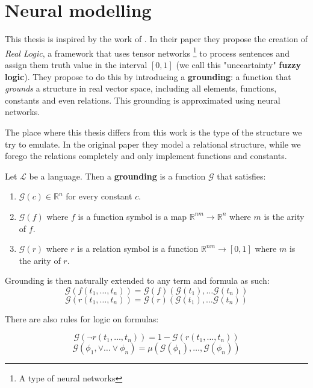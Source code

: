 \chapter{Neural modelling}

\label{chapter:implementation}
This thesis is inspired by the work of \cite{serafini}. In their paper they propose the creation of \textit{Real Logic}, a framework that uses tensor networks \footnote{A type of neural networks} to process sentences and assign them truth value in the interval $[0,1]$ (we call this "unceartainty" \textbf{fuzzy logic}). They propose to do this by introducing a \textbf{grounding}: a function that \textit{grounds} a structure in real vector space, including all elements, functions, constants and even relations. This grounding is approximated using neural networks. 

The place where this thesis differs from this work is the type of the structure we try to emulate. In the original paper they model a relational structure, while we forego the relations completely and only implement functions and constants.

\begin{defn}
	Let $\mathcal{L}$ be a language. Then a \textbf{grounding} is a function $\mathcal{G}$ that satisfies:
	\begin{enumerate}
		\item $\mathcal{G}(c)\in \mathbb{R}^n$ for every constant $c$.
		\item $\mathcal{G}(f)$ where $f$ is a function symbol is a map $\mathbb{R}^{nm}\rightarrow \mathbb{R}^n$ where $m$ is the arity of $f$.
		\item $\mathcal{G}(r)$ where $r$ is a relation symbol is a function $\mathbb{R}^{nm}\rightarrow [0,1]$ where $m$ is the arity of $r$.
	\end{enumerate}
\end{defn}

Grounding is then naturally extended to any term and formula as such:
$$\mathcal{G}(f(t_1,\dots,t_n))=\mathcal{G}(f)(\mathcal{G}(t_1),\dots\mathcal{G}(t_n))$$
$$\mathcal{G}(r(t_1,\dots,t_n))=\mathcal{G}(r)(\mathcal{G}(t_1),\dots\mathcal{G}(t_n))$$

There are also rules for logic on formulas:

$$\mathcal{G}(\neg r(t_1,\dots,t_n))=1-\mathcal{G}(r(t_1,\dots,t_n))$$
$$\mathcal{G}(\phi_1,\vee\dots \vee\phi_n)=\mu(\mathcal{G}(\phi_1),\dots,\mathcal{G}(\phi_n))$$

